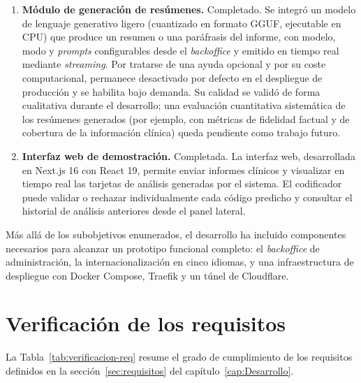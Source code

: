 \begin{enumerate}
 \item \textbf{Módulo de generación de resúmenes.} Completado. Se integró un modelo de lenguaje generativo ligero (cuantizado en formato GGUF, ejecutable en CPU) que produce un resumen o una paráfrasis del informe, con modelo, modo y \emph{prompts} configurables desde el \emph{backoffice} y emitido en tiempo real mediante \emph{streaming}. Por tratarse de una ayuda opcional y por su coste computacional, permanece desactivado por defecto en el despliegue de producción y se habilita bajo demanda. Su calidad se validó de forma cualitativa durante el desarrollo; una evaluación cuantitativa sistemática de los resúmenes generados (por ejemplo, con métricas de fidelidad factual y de cobertura de la información clínica) queda pendiente como trabajo futuro.

 \item \textbf{Interfaz web de demostración.} Completada. La interfaz web, desarrollada en Next.js 16 con React 19, permite enviar informes clínicos y visualizar en tiempo real las tarjetas de análisis generadas por el sistema. El codificador puede validar o rechazar individualmente cada código predicho y consultar el historial de análisis anteriores desde el panel lateral.
\end{enumerate}

Más allá de los subobjetivos enumerados, el desarrollo ha incluido componentes necesarios para alcanzar un prototipo funcional completo: el \emph{backoffice} de administración, la internacionalización en cinco idiomas, y una infraestructura de despliegue con Docker Compose, Traefik y un túnel de Cloudflare.

\section{Verificación de los requisitos}

La Tabla~\ref{tab:verificacion-req} resume el grado de cumplimiento de los requisitos definidos en la sección~\ref{sec:requisitos} del capítulo~\ref{cap:Desarrollo}.

